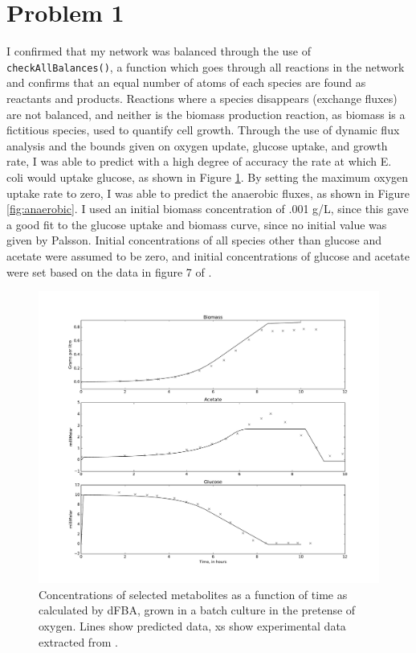 \documentclass{article}
\begin{document}
 
\section*{Problem 1}
I confirmed that my network was balanced through the use of \texttt{checkAllBalances()}, a function which goes through all reactions in the network and confirms that an equal number of atoms of each species are found as reactants and products. Reactions where a species disappears (exchange fluxes) are not balanced, and neither is the biomass production reaction, as biomass is a fictitious species, used to quantify cell growth. Through the use of dynamic flux analysis and the bounds given on oxygen update, glucose uptake, and growth rate, I was able to predict with a high degree of accuracy the rate at which E. coli would uptake glucose, as shown in Figure \ref{fig:aerobic}. By setting the maximum oxygen uptake rate to zero, I was able to predict the anaerobic fluxes, as shown in Figure \ref{fig:anaerobic}. I used an initial biomass concentration of .001 g/L, since this gave a good fit to the glucose uptake and biomass curve, since no initial value was given by Palsson. Initial concentrations of all species other than glucose and acetate were assumed to be zero, and initial concentrations of glucose and acetate were set based on the data in figure 7 of \cite{varma1994stoichiometric}.

\begin{figure}[!htb]
\includegraphics[width=18cm]{../MikesNewNetwork/figures/AttemptToRecreateFig7}
\caption{Concentrations of selected metabolites as a function of time as calculated by dFBA, grown in a batch culture in the pretense of oxygen. Lines show predicted data, xs show experimental data extracted from \cite{varma1994stoichiometric}.}
\label{fig:aerobic}
\end{figure}
\end{document}
